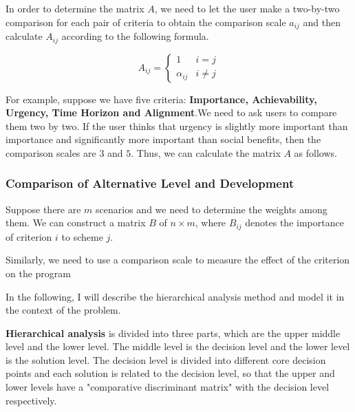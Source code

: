 In order to determine the matrix $A$, we need to let the user make a two-by-two comparison for each pair of criteria to obtain the comparison scale $a_{ij}$ and then calculate $A_{ij}$ according to the following formula.

\begin{equation}
   A_{ij}=\begin{cases}1 & i=j\\\alpha_{ij} & i \neq j\end{cases}
\end{equation}


For example, suppose we have five criteria: \textbf{Importance, Achievability, Urgency, Time Horizon and Alignment}.We need to ask users to compare them two by two. If the user thinks that urgency is slightly more important than importance and significantly more important than social benefits, then the comparison scales are $3$ and $5$. Thus, we can calculate the matrix $A$ as follows.

\subsubsection{Comparison of Alternative Level and Development}

Suppose there are $m$ scenarios and we need to determine the weights among them. We can construct a matrix $B$ of $n \times m$, where $B_{ij}$ denotes the importance of criterion $i$ to scheme $j$.

Similarly, we need to use a comparison scale to measure the effect of the criterion on the program


In the following, I will describe the hierarchical analysis method and model it in the context of the problem.


\textbf{Hierarchical analysis} is divided into three parts, which are the upper middle level and the lower level. The middle level is the decision level and the lower level is the solution level. The decision level is divided into different core decision points and each solution is related to the decision level, so that the upper and lower levels have a "comparative discriminant matrix" with the decision level respectively. 

